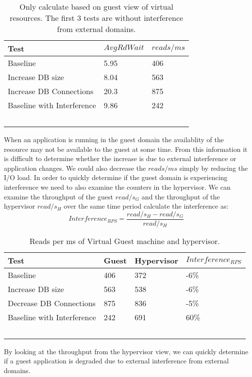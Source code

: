 \begin{table}[h]
  \begin{tabular}{ l l p{10cm} }
    Test & $AvgRdWait$ & $reads/ms$  \\
    \hline
    Baseline                     & 5.95 & 406 \\
    Increase DB size             & 8.04 & 563 \\
    Increase DB Connections      & 20.3 & 875 \\
    Baseline with Interference   & 9.86 & 242 \\
    \hline
  \end{tabular}
\caption{Only calculate based on guest view of virtual resources.  The first 3 tests are without interference from external domains.}
\label{tab:guestOnly}
\end{table}

When an application is running in the guest domain the availablity of the resource may not be available to the guest at some time.  From this information it is difficult to determine whether the increase is due to external interference or application changes. We could also decrease the $reads/ms$ simply by reducing the I/O load.  In order to quickly determine if the guest domain is experiencing interference we need to also examine the counters in the hypervisor.  We can examine the throughput of the guest $read/s_G$ and the throughput of the hypervisor $read/s_H$ over the same time period calculate the interference as:
\begin{equation}
	Interference_{RPS} = \frac{read/s_H - read/s_G}{read/s_H} 
\end{equation}

\begin{table}[h]
  \begin{tabular}{ l l l p{6cm} }
    Test & Guest & Hypervisor  & $Interference_{RPS}$ \\
    \hline
    Baseline                     & 406 & 372 & -6\% \\
    Increase DB size             & 563 & 538 & -6\%  \\
    Decrease DB Connections      & 875 & 836 & -5\%  \\
    Baseline with Interference   & 242 & 691 & 60\%  \\
    \hline
  \end{tabular}
\caption{Reads per ms of Virtual Guest machine and hypervisor.}
\label{tab:HypervisorGuest}
\end{table}
By looking at the throughput from the hypervisor view, we can quickly determine if a guest application is degraded due to external interference from external domains.  

